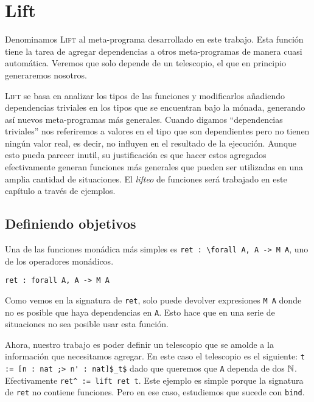 \chapter{Lift}\label{ch:lift}

Denominamos \textsc{Lift} al meta-programa desarrollado en este trabajo.
Esta función tiene la tarea de agregar dependencias a otros meta-programas de manera cuasi automática. Veremos que solo depende de un telescopio, el que en principio generaremos nosotros.

\textsc{Lift} se basa en analizar los tipos de las funciones y modificarlos añadiendo dependencias triviales en los tipos que se encuentran bajo la mónada, generando así nuevos meta-programas más generales.
Cuando digamos ``dependencias triviales'' nos referiremos a valores en el tipo que son dependientes pero no tienen ningún valor real, es decir, no influyen en el resultado de la ejecución.
Aunque esto pueda parecer inutil, su justificación es que hacer estos agregados efectivamente generan funciones más generales que pueden ser utilizadas en una amplia cantidad de situaciones. 
El \emph{lifteo} de funciones será trabajado en este capítulo a través de ejemplos.

\section{Definiendo objetivos}

Una de las funciones monádica más simples es \lstinline{ret : \forall A, A -> M A}, uno de los operadores monádicos.

\begin{lstlisting}[float=h,frame=tb,caption={Signatura de ret},label=lst:ret]
ret : forall A, A -> M A
\end{lstlisting}

Como vemos en la signatura de \lstinline{ret}, solo puede devolver expresiones \lstinline{M A} donde no es posible que haya dependencias en \lstinline{A}. Esto hace que en una serie de situaciones no sea posible usar esta función.


Ahora, nuestro trabajo es poder definir un telescopio que se amolde a la información que necesitamos agregar.
En este caso el telescopio es el siguiente: \lstinline{t := [n : nat ;> n' : nat]$_t$} dado que queremos que \lstinline{A} dependa de dos $\mathbb{N}$. Efectivamente \lstinline{ret^ := lift ret t}. Este ejemplo es simple porque la signatura de \lstinline{ret} no contiene funciones. Pero en ese caso, estudiemos que sucede con \lstinline{bind}.

